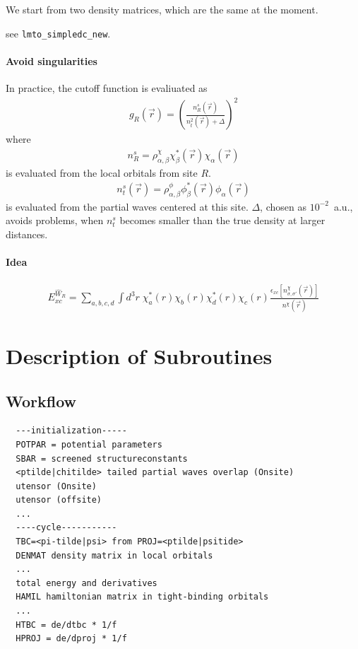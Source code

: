 \documentclass[11pt,a4paper]{report}
\begin{document}
We start from two density matrices, which are the same at the moment.

see \verb|lmto_simpledc_new|.

\subsubsection{Avoid singularities}
In practice, the cutoff function is evaliuated as 
\begin{eqnarray}
g_{R}(\vec{r})=\left(\frac{n^s_R(\vec{r})}{n_t^2(\vec{r})+\Delta}\right)^2
\end{eqnarray}
where
\begin{eqnarray}
n^s_R=\rho^{\chi}_{\alpha,\beta}\chi_\beta^*(\vec{r})\chi_{\alpha}(\vec{r})
\end{eqnarray}
 is evaluated from the local orbitals from site $R$.
\begin{eqnarray}
n^s_t(\vec{r})=\rho^{\phi}_{\alpha,\beta}\phi_\beta^*(\vec{r})\phi_{\alpha}(\vec{r})
\end{eqnarray}
is evaluated from the partial waves centered at this
site. $\Delta$, chosen as $10^{-2}$~a.u., avoids problems, when
$n^s_t$ becomes smaller than the true density at larger distances.


\subsubsection{Idea}
\begin{eqnarray}
E_{xc}^{\hat{W}_R}=\sum_{a,b,c,d}\int d^3r\; 
\chi^*_a(r)\chi_b(r)\chi^*_d(r)\chi_c(r)
\frac{\epsilon_{xc}[n^\chi_{\sigma,\sigma'}(\vec{r})]}
{n^\chi(\vec{r})}
\end{eqnarray}




\chapter{Description of Subroutines}
\section{Workflow}
\begin{verbatim}
  ---initialization----- 
  POTPAR = potential parameters 
  SBAR = screened structureconstants 
  <ptilde|chitilde> tailed partial waves overlap (Onsite) 
  utensor (Onsite) 
  utensor (offsite) 
  ...  
  ----cycle-----------
  TBC=<pi-tilde|psi> from PROJ=<ptilde|psitide> 
  DENMAT density matrix in local orbitals 
  ...  
  total energy and derivatives 
  HAMIL hamiltonian matrix in tight-binding orbitals 
  ...  
  HTBC = de/dtbc * 1/f 
  HPROJ = de/dproj * 1/f
\end{verbatim}
\end{document}
